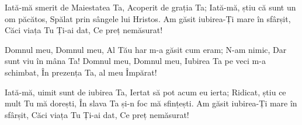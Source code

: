 \beginverse
Iată-mă smerit de Maiestatea Ta,
Acoperit de grația Ta;
Iată-mă, știu că sunt un om păcătos,
Spălat prin sângele lui Hristos.
Am găsit iubirea-Ți mare în sfârșit,
Căci viața Tu Ți-ai dat,
Ce preț nemăsurat!
\endverse

\beginchorus
Domnul meu, Domnul meu,
Al Tău har m-a găsit cum eram;
N-am nimic,
Dar sunt viu în mâna Ta!
Domnul meu, Domnul meu,
Iubirea Ta pe veci m-a schimbat,
În prezența Ta, al meu Împărat!
\endchorus

\beginverse
Iată-mă, uimit sunt de iubirea Ta,
Iertat să pot acum eu ierta;
Ridicat, știu ce mult Tu mă dorești,
În slava Ta și-n foc mă sfințești.
Am găsit iubirea-Ți mare în sfârșit,
Căci viața Tu Ți-ai dat,
Ce preț nemăsurat!
\endverse
\endsong